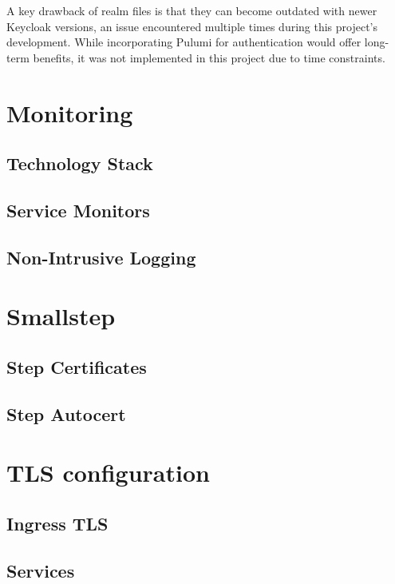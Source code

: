 A key drawback of realm files is that they can become outdated with newer Keycloak versions, an issue encountered multiple times during this project's development. While incorporating Pulumi for authentication would offer long-term benefits, it was not implemented in this project due to time constraints.

\section{Monitoring}

\subsection{Technology Stack}

\subsection{Service Monitors}

\subsection{Non-Intrusive Logging}

\section{Smallstep}\label{sec:smallstep}

\subsection{Step Certificates}

\subsection{Step Autocert}

\section{TLS configuration}

\subsection{Ingress TLS}

\subsection{Services}

